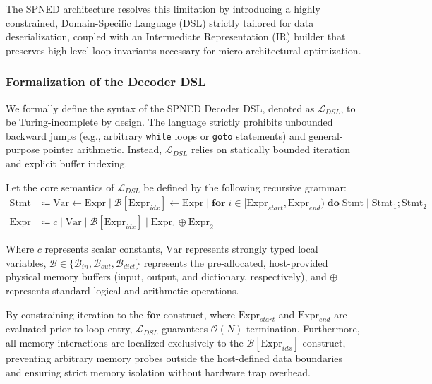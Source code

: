 \documentclass[onecolumn]{IEEEtran}
\numberwithin{equation}{section}
\theoremstyle{definition}
\theoremstyle{remark}
\begin{document}
The SPNED architecture resolves this limitation by introducing a highly constrained, Domain-Specific Language (DSL) strictly tailored for data deserialization, coupled with an Intermediate Representation (IR) builder that preserves high-level loop invariants necessary for micro-architectural optimization.

\subsubsection{Formalization of the Decoder DSL}

We formally define the syntax of the SPNED Decoder DSL, denoted as $\mathcal{L}_{DSL}$, to be Turing-incomplete by design. The language strictly prohibits unbounded backward jumps (e.g., arbitrary \texttt{while} loops or \texttt{goto} statements) and general-purpose pointer arithmetic. Instead, $\mathcal{L}_{DSL}$ relies on statically bounded iteration and explicit buffer indexing. 

Let the core semantics of $\mathcal{L}_{DSL}$ be defined by the following recursive grammar:
\begin{equation}
\begin{aligned}
\text{Stmt} & \Coloneqq \text{Var} \leftarrow \text{Expr} \mid \mathcal{B}[\text{Expr}_{idx}] \leftarrow \text{Expr} \mid \mathbf{for}\; i \in [\text{Expr}_{start}, \text{Expr}_{end}) \;\mathbf{do}\; \text{Stmt} \mid \text{Stmt}_1 ; \text{Stmt}_2 \\
\text{Expr} & \Coloneqq c \mid \text{Var} \mid \mathcal{B}[\text{Expr}_{idx}] \mid \text{Expr}_1 \oplus \text{Expr}_2
\end{aligned}
\end{equation}

Where $c$ represents scalar constants, $\text{Var}$ represents strongly typed local variables, $\mathcal{B} \in \{\mathcal{B}_{in}, \mathcal{B}_{out}, \mathcal{B}_{dict}\}$ represents the pre-allocated, host-provided physical memory buffers (input, output, and dictionary, respectively), and $\oplus$ represents standard logical and arithmetic operations. 

By constraining iteration to the $\mathbf{for}$ construct, where $\text{Expr}_{start}$ and $\text{Expr}_{end}$ are evaluated prior to loop entry, $\mathcal{L}_{DSL}$ guarantees $\mathcal{O}(N)$ termination. Furthermore, all memory interactions are localized exclusively to the $\mathcal{B}[\text{Expr}_{idx}]$ construct, preventing arbitrary memory probes outside the host-defined data boundaries and ensuring strict memory isolation without hardware trap overhead.
\end{document}
